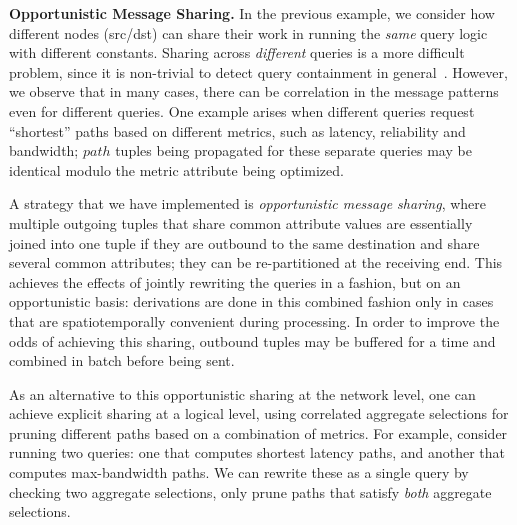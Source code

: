 




\vspace*{.3em}\noindent
{\bf Opportunistic Message Sharing.\/}
In the previous example, we consider how different nodes (src/dst) can
share their work in running the {\em same} query logic with different
constants. Sharing across {\em different} queries is a more difficult problem, since it
is non-trivial to detect query containment in
general~\cite{containment}. However, we observe that in many cases,
there can be correlation in the message patterns even for different
queries. One example arises when different queries request ``shortest'' paths based on different metrics, such as latency,
reliability and bandwidth; $path$ tuples being propagated for these
separate queries may be identical modulo the metric attribute being
optimized. 

A strategy that we have implemented is {\em opportunistic message
  sharing}, where multiple outgoing tuples that share common attribute
  values are essentially joined into one tuple if they are
  outbound to the same destination and share several common
  attributes; they can be re-partitioned at the receiving end. This
  achieves the effects of jointly rewriting the queries in a
  fashion, but on an opportunistic basis: derivations are
  done in this combined fashion only in cases that are
  spatiotemporally convenient during processing.
In order to improve the odds of achieving this sharing, outbound tuples
  may be buffered for a time and combined in batch before being sent.

As an alternative to this opportunistic sharing at the network level,
one can achieve explicit sharing at a logical level, \eg using correlated
aggregate selections for pruning different paths based on a combination
of metrics. For example, consider running two queries: one that computes
shortest latency paths, and another that computes max-bandwidth paths. We can
rewrite these as a single query by checking two aggregate selections,
\ie only prune paths that satisfy {\em both} aggregate
selections.



